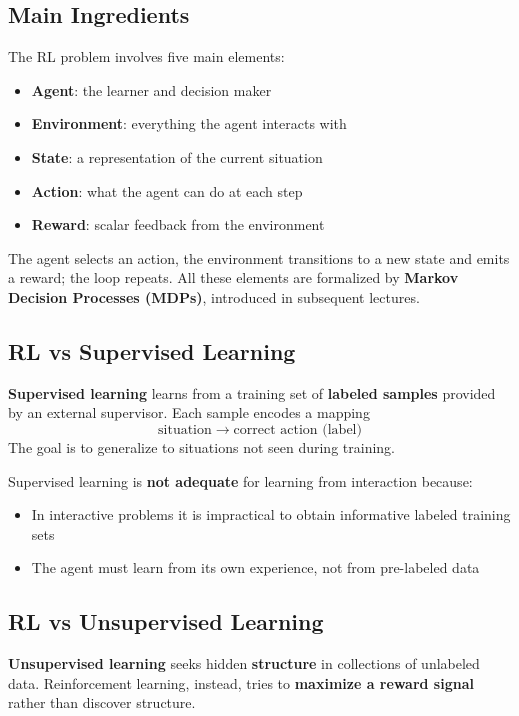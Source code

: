 \documentclass[11pt,a4paper]{article}
\theoremstyle{definition}
\theoremstyle{plain}
\theoremstyle{remark}
\begin{document}
\subsection{Main Ingredients}

The RL problem involves five main elements:

\begin{itemize}
    \item \textbf{Agent}: the learner and decision maker
    \item \textbf{Environment}: everything the agent interacts with
    \item \textbf{State}: a representation of the current situation
    \item \textbf{Action}: what the agent can do at each step
    \item \textbf{Reward}: scalar feedback from the environment
\end{itemize}

The agent selects an action, the environment transitions to a new state and emits a reward; the loop repeats. All these elements are formalized by \textbf{Markov Decision Processes (MDPs)}, introduced in subsequent lectures.

\subsection{RL vs Supervised Learning}

\textbf{Supervised learning} learns from a training set of \textbf{labeled samples} provided by an external supervisor. Each sample encodes a mapping
\[
    \text{situation} \;\to\; \text{correct action (label)}
\]
The goal is to generalize to situations not seen during training.

Supervised learning is \textbf{not adequate} for learning from interaction because:
\begin{itemize}
    \item In interactive problems it is impractical to obtain informative labeled training sets
    \item The agent must learn from its own experience, not from pre-labeled data
\end{itemize}

\subsection{RL vs Unsupervised Learning}

\textbf{Unsupervised learning} seeks hidden \textbf{structure} in collections of unlabeled data. Reinforcement learning, instead, tries to \textbf{maximize a reward signal} rather than discover structure.
\end{document}
